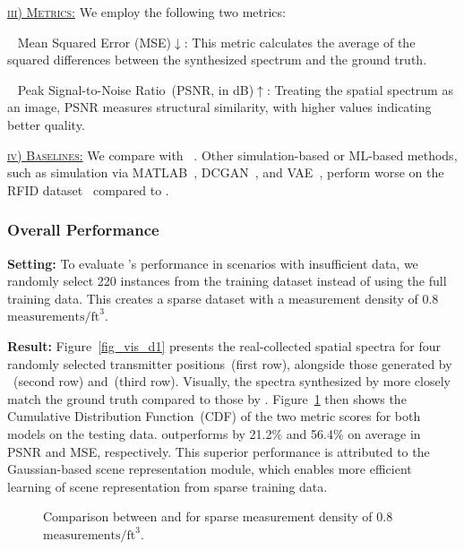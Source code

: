 \underline{\textsc{iii) Metrics:}}
We employ the following two metrics:

\textbullet~
Mean Squared Error (MSE)$\downarrow$: This metric calculates the average of the squared differences between the synthesized spectrum and the ground truth.

\textbullet~
Peak Signal-to-Noise Ratio~(PSNR, in dB)$\uparrow$: Treating the spatial spectrum as an image, PSNR measures structural similarity, with higher values indicating better quality.



\underline{\textsc{iv) Baselines:}}
We compare \ourSystem with \nerft~\cite{zhao2023nerf}.  
Other simulation-based or ML-based methods, such as simulation via MATLAB~\cite{RayTracingToolbox}, DCGAN~\cite{radford2015unsupervised}, and VAE~\cite{liu2021fire}, perform worse on the RFID dataset~\cite{zhao2023nerf} compared to \nerft.  





\subsubsection{Overall Performance}\label{sec_spectrum_syn}
\textbf{Setting:}
To evaluate \ourSystem's performance in scenarios with insufficient data, we randomly select 220 instances from the training dataset instead of using the full training data.  
This creates a sparse dataset with a measurement density of 0.8\,$\text{measurements/ft}^3$.  



\textbf{Result:}  
Figure~\ref{fig_vis_d1} presents the real-collected spatial spectra for four randomly selected transmitter positions~(first row), alongside those generated by \ourSystem~(second row) and~\nerft (third row).  
Visually, the spectra synthesized by \ourSystem more closely match the ground truth compared to those by \nerft.  
Figure~\ref{fig_quanti_d1} then shows the Cumulative Distribution Function~(CDF) of the two metric scores for both models on the testing data. 
\ourSystem outperforms \nerft by 21.2\% and 56.4\% on average in PSNR and MSE, respectively.  
This superior performance is attributed to the Gaussian-based scene representation module, which enables more efficient learning of scene representation from sparse training data.  







\begin{figure}[tp]
\centering
\caption{Comparison between \nerft and \ourSystem for sparse measurement density of 0.8\,\(\text{measurements}/\text{ft}^3\).}
\Description[]{}
	\label{fig_quanti_d1}
\end{figure}


